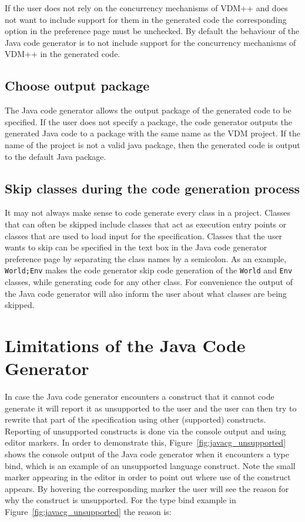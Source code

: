 If the user does not rely on the concurrency mechanisms of VDM++ and
does not want to include support for them in the generated code the
corresponding option in the preference page must be unchecked. By
default the behaviour of the Java code generator is to not include
support for the concurrency mechanisms of VDM++ in the generated code.

\subsection{Choose output package}

The Java code generator allows the output package of the generated
code to be specified. If the user does not specify a package, the code
generator outputs the generated Java code to a package with the same
name as the VDM project. If the name of the project is not a valid
java package, then the generated code is output to the default Java
package.

\subsection{Skip classes during the code generation process}

It may not always make sense to code generate every class in a
project. Classes that can often be skipped include classes that act as
execution entry points or classes that are used to load input for the
specification. Classes that the user wants to skip can be specified in
the text box in the Java code generator preference page by separating
the class names by a semicolon. As an example, \texttt{World;Env}
makes the code generator skip code generation of the \texttt{World}
and \texttt{Env} classes, while generating code for any other
class. For convenience the output of the Java code generator will also
inform the user about what classes are being skipped.

\section{Limitations of the Java Code Generator}

In case the Java code generator encounters a construct that it cannot
code generate it will report it as unsupported to the user and the
user can then try to rewrite that part of the specification using
other (supported) constructs. Reporting of unsupported constructs is
done via the console output and using editor markers. In order to
demonstrate this, Figure~\ref{fig:javacg_unsupported} shows the
console output of the Java code generator when it encounters a type
bind, which is an example of an unsupported language construct. Note
the small marker appearing in the editor in order to point out where
use of the construct appears. By hovering the corresponding marker the
user will see the reason for why the construct is unsupported. For the
type bind example in Figure~\ref{fig:javacg_unsupported} the reason
is:\\

